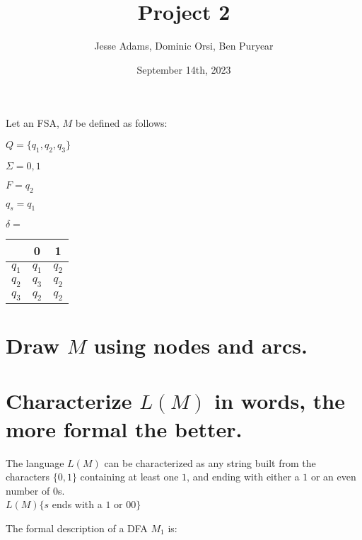 \documentclass{article}
\title{Project 2}
\author{Jesse Adams, Dominic Orsi, Ben Puryear}
\date{September 14th, 2023}
\begin{document}
\maketitle

Let an FSA, $M$ be defined as follows:

$Q = \{q_1, q_2, q_3\}$

$\Sigma = {0,1}$

$F = {q_2}$

$q_s = q_1$


$\delta = $
\begin{tabular}{ |c|c|c| }
	& 0     & 1     \\
	\hline
	$q_1$ & $q_1$ & $q_2$ \\
	$q_2$ & $q_3$ & $q_2$ \\
	$q_3$ & $q_2$ & $q_2$ \\
\end{tabular}


\section{Draw $M$ using nodes and arcs.}

\section{Characterize $L(M)$ in words, the more formal the better.}

The language $L(M)$ can be characterized as any string built from the characters $\{0, 1\}$ containing at least one $1$, and ending with either a $1$ or an even number of $0$s. \\
$L(M)\{s$ ends with a $1$ or $00\}$
\newpage

The formal description of a DFA $M_1$ is:
\end{document}

